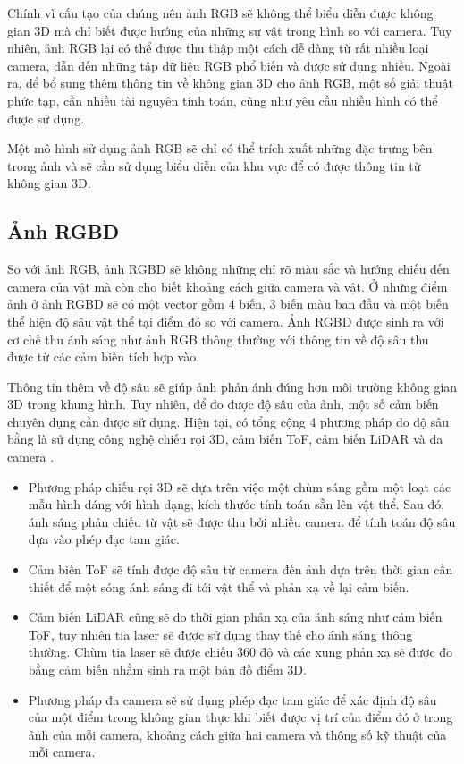 Chính vì cấu tạo của chúng nên ảnh RGB sẽ không thể biểu diễn được không gian 3D mà chỉ biết được hướng của những sự vật trong hình so với camera. Tuy nhiên, ảnh RGB lại có thể được thu thập một cách dễ dàng từ rất nhiều loại camera, dẫn đến những tập dữ liệu RGB phổ biến và được sử dụng nhiều. Ngoài ra, để bổ sung thêm thông tin về không gian 3D cho ảnh RGB, một số giải thuật phức tạp, cần nhiều tài nguyên tính toán, cũng như yêu cầu nhiều hình có thể được sử dụng.

Một mô hình sử dụng ảnh RGB sẽ chỉ có thể trích xuất những đặc trưng bên trong ảnh và sẽ cần sử dụng biểu diễn của khu vực để có được thông tin từ không gian 3D.

\subsection{Ảnh RGBD}

So với ảnh RGB, ảnh RGBD sẽ không những chỉ rõ màu sắc và hướng chiếu đến camera của vật mà còn cho biết khoảng cách giữa camera và vật. Ở những điểm ảnh ở ảnh RGBD sẽ có một vector gồm 4 biến, 3 biến màu ban đầu và một biến thể hiện độ sâu vật thể tại điểm đó so với camera. Ảnh RGBD được sinh ra với cơ chế thu ánh sáng như ảnh RGB thông thường với thông tin về độ sâu thu được từ các cảm biến tích hợp vào.

Thông tin thêm về độ sâu sẽ giúp ảnh phản ánh đúng hơn môi trường không gian 3D trong khung hình. Tuy nhiên, để đo được độ sâu của ảnh, một số cảm biến chuyên dụng cần được sử dụng. Hiện tại, có tổng cộng 4 phương pháp đo độ sâu bằng là sử dụng công nghệ chiếu rọi 3D, cảm biến ToF, cảm biến LiDAR và đa camera \cite{lopes2022survey}.
\begin{itemize}
    \item Phương pháp chiếu rọi 3D sẽ dựa trên việc một chùm sáng gồm một loạt các mẫu hình dáng với hình dạng, kích thước tính toán sẵn lên vật thể. Sau đó, ánh sáng phản chiếu từ vật sẽ được thu bởi nhiều camera để tính toán độ sâu dựa vào phép đạc tam giác.
    \item Cảm biến ToF sẽ tính được độ sâu từ camera đến ảnh dựa trên thời gian cần thiết để một sóng ánh sáng đi tới vật thể và phản xạ về lại cảm biến.
    \item Cảm biến LiDAR cũng sẽ đo thời gian phản xạ của ánh sáng như cảm biến ToF, tuy nhiên tia laser sẽ được sử dụng thay thế cho ánh sáng thông thường. Chùm tia laser sẽ được chiếu 360 độ và các xung phản xạ sẽ được đo bằng cảm biến nhằm sinh ra một bản đồ điểm 3D.
    \item Phương pháp đa camera sẽ sử dụng phép đạc tam giác để xác định độ sâu của một điểm trong không gian thực khi biết được vị trí của điểm đó ở trong ảnh của mỗi camera, khoảng cách giữa hai camera và thông số kỹ thuật của mỗi camera.
\end{itemize}

